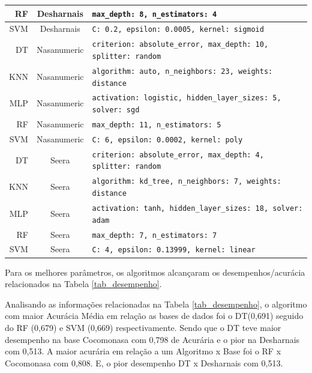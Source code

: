 \documentclass[12pt]{article}
\begin{document}
\begin{table}[h!]
\begin{center}
\begin{tabular}{r|c|l}
      RF                  & Desharnais             & \scriptsize{\verb=max_depth: 8, n_estimators: 4=} \\ \hline
      SVM                 & Desharnais             & \scriptsize{\verb=C: 0.2, epsilon: 0.0005, kernel: sigmoid=} \\ \hline
      DT                  & Nasanumeric            & \scriptsize{\verb=criterion: absolute_error, max_depth: 10, splitter: random=} \\ \hline
      KNN                 & Nasanumeric            & \scriptsize{\verb=algorithm: auto, n_neighbors: 23, weights: distance=} \\ \hline
      MLP                 & Nasanumeric            & \scriptsize{\verb=activation: logistic, hidden_layer_sizes: 5,  solver: sgd=} \\ \hline
      RF                  & Nasanumeric            & \scriptsize{\verb=max_depth: 11, n_estimators: 5=} \\ \hline
      SVM                 & Nasanumeric            & \scriptsize{\verb=C: 6, epsilon: 0.0002, kernel: poly=} \\ \hline
      DT                  & Seera                  & \scriptsize{\verb=criterion: absolute_error, max_depth: 4, splitter: random=} \\ \hline
      KNN                 & Seera                  & \scriptsize{\verb=algorithm: kd_tree, n_neighbors: 7, weights: distance=} \\ \hline
      MLP                 & Seera                  & \scriptsize{\verb=activation: tanh, hidden_layer_sizes: 18, solver: adam=} \\ \hline
      RF                  & Seera                  & \scriptsize{\verb=max_depth: 7, n_estimators: 7=} \\ \hline
      SVM                 & Seera                  & \scriptsize{\verb=C: 4, epsilon: 0.13999, kernel: linear=} \\ \hline
    \end{tabular}
  \end{center}
\end{table}

Para os melhores parâmetros, os algoritmos alcançaram os desempenhos/acurácia relacionados na Tabela \ref{tab_desempenho}.

Analisando as informações relacionadas na Tabela \ref{tab_desempenho}, o algoritmo com maior Acurácia Média em relação as bases de dados foi o DT(0,691) seguido do RF (0,679) e SVM (0,669) respectivamente. Sendo que o DT teve maior desempenho na base Cocomonasa com 0,798 de Acurária e o pior na Desharnais com 0,513. A maior acurária em relação a um Algoritmo x Base foi o RF x Cocomonasa com 0,808. E, o pior desempenho DT x Desharnais com 0,513.
\end{document}
